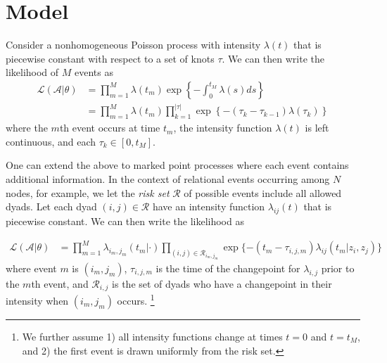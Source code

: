 \documentclass[11pt]{article}
\begin{document}
\section{Model}

Consider a nonhomogeneous Poisson process with  intensity $\lambda(t)$ that is piecewise constant with respect to a set of knots $\tau$.  We can then write the likelihood of $M$ events as
\begin{align}
\mathcal{L}(\mathcal{A}|\theta) &= \prod_{m=1}^M \lambda(t_m) \exp\left\{ - \int_{0}^{t_M} \lambda(s)ds \right\} \\
&= \prod_{m=1}^M \lambda(t_m) \prod_{k=1}^{|\tau|} \exp\left\{ - (\tau_{k} - \tau_{k-1}) \lambda(\tau_k) \right\}
\end{align}
\noindent where the $m$th event occurs at time $t_m$, the intensity function $\lambda(t)$ is left continuous, and each $\tau_k \in [0,t_M]$.

One can extend the above to marked point processes where each event contains additional information.  In the context of relational events occurring among $N$ nodes, for example, we let the \emph{risk set} $\mathcal{R}$ of possible events include all allowed dyads.  Let each dyad $(i,j) \in \mathcal{R}$ have an intensity function $\lambda_{ij}(t)$ that is piecewise constant.  We can then write the likelihood as  

\begin{align}
\mathcal{L}(\mathcal{A}|\theta) &= \prod_{m=1}^M \lambda_{i_m,j_m}(t_m|\cdot) \prod_{(i,j) \in \mathcal{R}_{i_m,j_m}}\exp\{ - (t_m - \tau_{i,j,m}) \lambda_{ij}(t_m | z_i,z_j) \}
\end{align}
\noindent where event $m$ is $(i_m,j_m)$, $\tau_{i,j,m}$ is the time  of the changepoint for $\lambda_{i,j}$ prior to the $m$th event, and $\mathcal{R}_{i,j}$ is the set of dyads who have a changepoint in their intensity when $(i_m,j_m)$ occurs. \footnote{We further assume 1) all intensity functions change at times $t=0$ and $t=t_M$, and 2) the first event is drawn uniformly from the risk set.}
\end{document}
